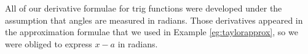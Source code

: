 \begin{warning}\label{warning:radians}
All of our derivative formulae for trig functions were developed under
the assumption that angles are measured in radians.
Those derivatives appeared in the approximation formulae that we used
in Example \ref{eg:taylorapprox}, so we were obliged to express $x-a$
in radians.
\end{warning}

